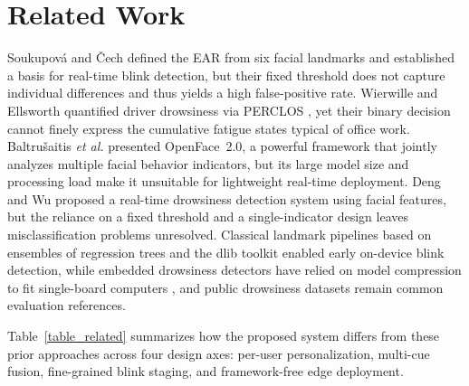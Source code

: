 \documentclass{IEEE_lsens}
\begin{document}
\section{Related Work}
Soukupov\'a and \v{C}ech \cite{soukupova2016} defined the EAR from six
facial landmarks and established a basis for real-time blink detection, but
their fixed threshold does not capture individual differences and thus
yields a high false-positive rate. Wierwille and Ellsworth
\cite{wierwille1994} quantified driver drowsiness via PERCLOS
\cite{dinges1998}, yet their binary decision cannot finely express the
cumulative fatigue states typical of office work. Baltru\v{s}aitis
\textit{et al.} \cite{baltrusaitis2018} presented OpenFace~2.0, a powerful
framework that jointly analyzes multiple facial behavior indicators, but its
large model size and processing load make it unsuitable for lightweight
real-time deployment. Deng and Wu \cite{deng2019} proposed a real-time
drowsiness detection system using facial features, but the reliance on a
fixed threshold and a single-indicator design leaves misclassification
problems unresolved. Classical landmark pipelines based on ensembles of
regression trees \cite{kazemi2014} and the dlib toolkit \cite{king2009}
enabled early on-device blink detection, while embedded drowsiness detectors
have relied on model compression to fit single-board computers
\cite{reddy2017}, and public drowsiness datasets \cite{ghoddoosian2019}
remain common evaluation references.

Table~\ref{table_related} summarizes how the proposed system differs from
these prior approaches across four design axes: per-user personalization,
multi-cue fusion, fine-grained blink staging, and framework-free edge
deployment.
\end{document}
